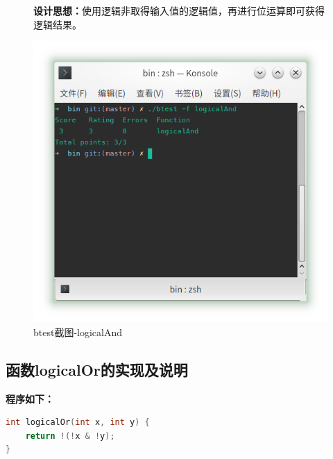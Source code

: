 \begin{figure}[H]
\begin{minipage}[c]{0.5\linewidth}
\textbf{设计思想：}使用逻辑非取得输入值的逻辑值，再进行位运算即可获得逻辑结果。
		
\end{minipage}
\begin{minipage}[c]{0.4\linewidth}
\centering
\includegraphics[width=0.9\linewidth]{figures/logicalAnd}
\caption{btest截图-logicalAnd}
\label{fig:logicalAnd}
\end{minipage}
\end{figure}

\subsection{函数logicalOr的实现及说明}
\textbf{程序如下：}

\begin{lstlisting}[language = c]
int logicalOr(int x, int y) {
	return !(!x & !y);
}
\end{lstlisting}

